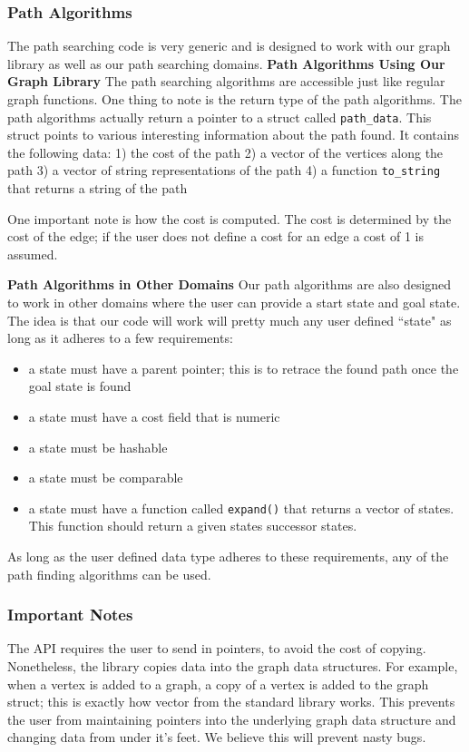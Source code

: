 \documentclass{article}
\begin{document}
\subsubsection{Path Algorithms}
The path searching code is very generic and is designed to work with our graph library as well as our path searching domains.  
\textbf{Path Algorithms Using Our Graph Library}
The path searching algorithms are accessible just like regular graph functions. One thing to note is the return type of the path algorithms. The path algorithms actually return a pointer to a struct called \texttt{path\_data}. This struct points to various interesting information about the path found. It contains the following data: 1) the cost of the path 2) a vector of the vertices along the path 3) a vector of string representations of the path 4) a function \texttt{to\_string} that returns a string of the path
\par
One important note is how the cost is computed. The cost is determined by the cost of the edge; if the user does not define a cost for an edge a cost of 1 is assumed.

\textbf{Path Algorithms in Other Domains}
Our path algorithms are also designed to work in other domains where the user can provide a start state and goal state. The idea is that our code will work will pretty much any user defined ``state" as long as it adheres to a few requirements:
\begin{itemize}
\item a state must have a parent pointer; this is to retrace the found path once the goal state is found
\item a state must have a cost field that is numeric
\item a state must be hashable
\item a state must be comparable
\item a state must have a function called \texttt{expand()} that returns a vector of states. This function should return a given states successor states.
\end{itemize}
As long as the user defined data type adheres to these requirements, any of the path finding algorithms can be used.

\subsubsection{Important Notes}
The API requires the user to send in pointers, to avoid the cost of copying. Nonetheless, the library copies data into the graph data structures. For example, when a vertex is added to a graph, a copy of a vertex is added to the graph struct; this is exactly how vector from the standard library works. This prevents the user from maintaining pointers into the underlying graph data structure and changing data from under it's feet. We believe this will prevent nasty bugs.
\end{document}
